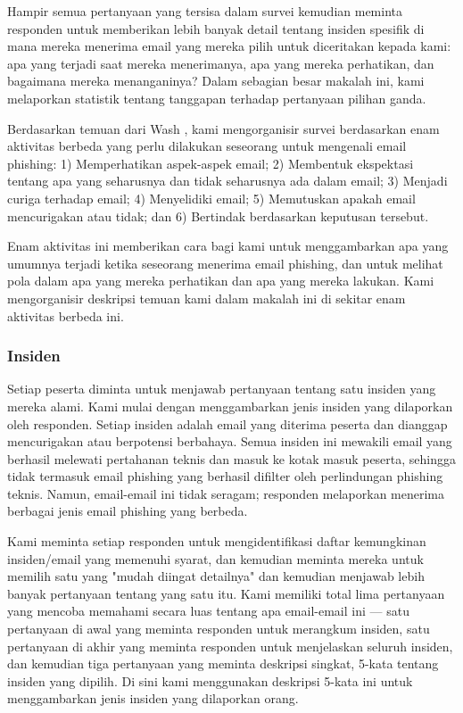 \documentclass[lettersize,journal]{IEEEtran}
\begin{document}
Hampir semua pertanyaan yang tersisa dalam survei kemudian meminta responden
untuk memberikan lebih banyak detail tentang insiden spesifik di mana mereka
menerima email yang mereka pilih untuk diceritakan kepada kami: apa yang
terjadi saat mereka menerimanya, apa yang mereka perhatikan, dan bagaimana
mereka menanganinya? Dalam sebagian besar makalah ini, kami melaporkan
statistik tentang tanggapan terhadap pertanyaan pilihan ganda.

Berdasarkan temuan dari Wash \cite{tigaempat}, kami mengorganisir survei
berdasarkan enam aktivitas berbeda yang perlu dilakukan seseorang untuk
mengenali email phishing: 1) Memperhatikan aspek-aspek email; 2) Membentuk
ekspektasi tentang apa yang seharusnya dan tidak seharusnya ada dalam email; 3)
Menjadi curiga terhadap email; 4) Menyelidiki email; 5) Memutuskan apakah email
mencurigakan atau tidak; dan 6) Bertindak berdasarkan keputusan tersebut.

Enam aktivitas ini memberikan cara bagi kami untuk menggambarkan apa yang
umumnya terjadi ketika seseorang menerima email phishing, dan untuk melihat
pola dalam apa yang mereka perhatikan dan apa yang mereka lakukan. Kami
mengorganisir deskripsi temuan kami dalam makalah ini di sekitar enam aktivitas
berbeda ini.

\subsubsection{Insiden}

Setiap peserta diminta untuk menjawab pertanyaan tentang satu insiden yang
mereka alami. Kami mulai dengan menggambarkan jenis insiden yang dilaporkan
oleh responden. Setiap insiden adalah email yang diterima peserta dan dianggap
mencurigakan atau berpotensi berbahaya. Semua insiden ini mewakili email yang
berhasil melewati pertahanan teknis dan masuk ke kotak masuk peserta, sehingga
tidak termasuk email phishing yang berhasil difilter oleh perlindungan phishing
teknis. Namun, email-email ini tidak seragam; responden melaporkan menerima
berbagai jenis email phishing yang berbeda.

Kami meminta setiap responden untuk mengidentifikasi daftar kemungkinan
insiden/email yang memenuhi syarat, dan kemudian meminta mereka untuk memilih
satu yang "mudah diingat detailnya" dan kemudian menjawab lebih banyak
pertanyaan tentang yang satu itu. Kami memiliki total lima pertanyaan yang
mencoba memahami secara luas tentang apa email-email ini — satu pertanyaan di
awal yang meminta responden untuk merangkum insiden, satu pertanyaan di akhir
yang meminta responden untuk menjelaskan seluruh insiden, dan kemudian tiga
pertanyaan yang meminta deskripsi singkat, 5-kata tentang insiden yang dipilih.
Di sini kami menggunakan deskripsi 5-kata ini untuk menggambarkan jenis insiden
yang dilaporkan orang.
\end{document}

